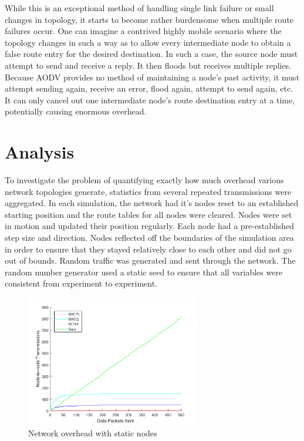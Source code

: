 \documentclass[conference]{IEEEtran}
\begin{document}
While this is an exceptional method of handling single link failure or small changes in topology, it starts to become rather burdensome when multiple route failures occur. One can imagine a contrived highly mobile scenario where the topology changes in such a way as to allow every intermediate node to obtain a false route entry for the desired destination. In such a case, the source node must attempt to send and receive a reply. It then floods but receives multiple replies. Because AODV provides no method of maintaining a node's past activity, it must attempt sending again, receive an error, flood again, attempt to send again, etc. It can only cancel out one intermediate node's route destination entry at a time, potentially causing enormous overhead.

\section{Analysis}
\label{sect:analysis}

To investigate the problem of quantifying exactly how much overhead various network topologies generate, statistics from several repeated transmissions were aggregated. In each simulation, the network had it's nodes reset to an established starting position and the route tables for all nodes were cleared. Nodes were set in motion and updated their position regularly. Each node had a pre-established step size and direction. Nodes reflected off the boundaries of the simulation area in order to ensure that they stayed relatively close to each other and did not go out of bounds. Random traffic was generated and sent through the network. The random number generator used a static seed to ensure that all variables were consistent from experiment to experiment. 

\begin{figure}[ht]
	\centering
	\includegraphics[width=3in]{movement_none.png}
	\caption{Network overhead with static nodes}
	\label{fig:movement_none}
\end{figure}
\end{document}
